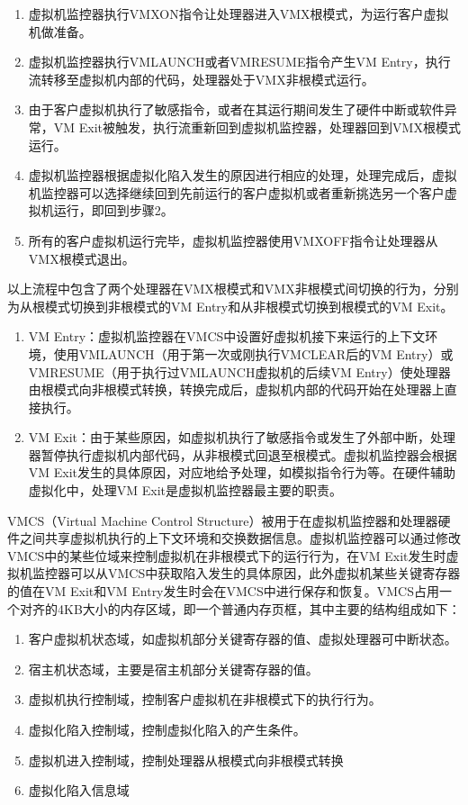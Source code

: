 \begin{enumerate}
\item 虚拟机监控器执行VMXON指令让处理器进入VMX根模式，为运行客户虚拟机做准备。
\item 虚拟机监控器执行VMLAUNCH或者VMRESUME指令产生VM Entry，执行流转移至虚拟机内部的代码，处理器处于VMX非根模式运行。
\item 由于客户虚拟机执行了敏感指令，或者在其运行期间发生了硬件中断或软件异常，VM Exit被触发，执行流重新回到虚拟机监控器，处理器回到VMX根模式运行。
\item 虚拟机监控器根据虚拟化陷入发生的原因进行相应的处理，处理完成后，虚拟机监控器可以选择继续回到先前运行的客户虚拟机或者重新挑选另一个客户虚拟机运行，即回到步骤2。
\item 所有的客户虚拟机运行完毕，虚拟机监控器使用VMXOFF指令让处理器从VMX根模式退出。
\end{enumerate}

以上流程中包含了两个处理器在VMX根模式和VMX非根模式间切换的行为，分别为从根模式切换到非根模式的VM Entry和从非根模式切换到根模式的VM Exit。

\begin{enumerate}
\item VM Entry：虚拟机监控器在VMCS中设置好虚拟机接下来运行的上下文环境，使用VMLAUNCH（用于第一次或刚执行VMCLEAR后的VM Entry）或VMRESUME（用于执行过VMLAUNCH虚拟机的后续VM Entry）使处理器由根模式向非根模式转换，转换完成后，虚拟机内部的代码开始在处理器上直接执行。
\item VM Exit：由于某些原因，如虚拟机执行了敏感指令或发生了外部中断，处理器暂停执行虚拟机内部代码，从非根模式回退至根模式。虚拟机监控器会根据VM Exit发生的具体原因，对应地给予处理，如模拟指令行为等。在硬件辅助虚拟化中，处理VM Exit是虚拟机监控器最主要的职责。
\end{enumerate}

VMCS（Virtual Machine Control Structure）被用于在虚拟机监控器和处理器硬件之间共享虚拟机执行的上下文环境和交换数据信息。虚拟机监控器可以通过修改VMCS中的某些位域来控制虚拟机在非根模式下的运行行为，在VM Exit发生时虚拟机监控器可以从VMCS中获取陷入发生的具体原因，此外虚拟机某些关键寄存器的值在VM Exit和VM Entry发生时会在VMCS中进行保存和恢复。VMCS占用一个对齐的4KB大小的内存区域，即一个普通内存页框，其中主要的结构组成如下：

\begin{enumerate}
\item 客户虚拟机状态域，如虚拟机部分关键寄存器的值、虚拟处理器可中断状态。
\item 宿主机状态域，主要是宿主机部分关键寄存器的值。
\item 虚拟机执行控制域，控制客户虚拟机在非根模式下的执行行为。
\item 虚拟化陷入控制域，控制虚拟化陷入的产生条件。
\item 虚拟机进入控制域，控制处理器从根模式向非根模式转换
\item 虚拟化陷入信息域
\end{enumerate}

